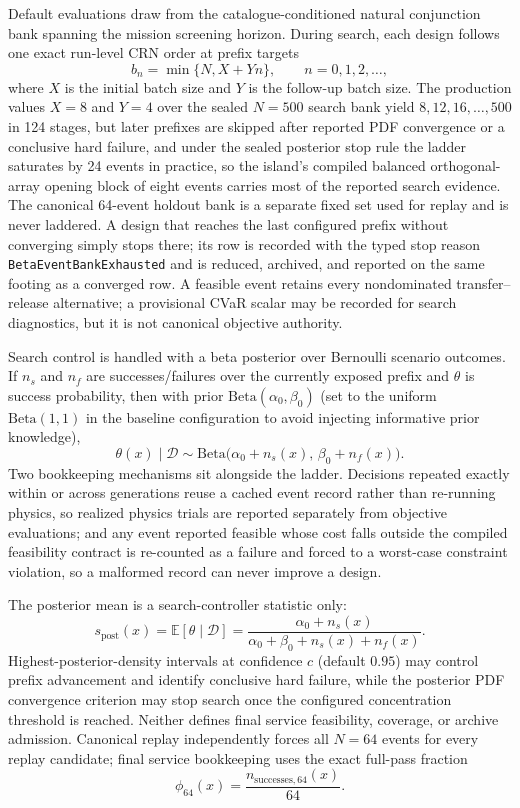     Default evaluations draw from the catalogue-conditioned natural conjunction bank spanning the mission screening horizon. During search, each design follows one exact run-level CRN order at prefix targets
    \[
        b_n=\min\{N,X+Yn\},\qquad n=0,1,2,\ldots,
    \]
    where \(X\) is the initial batch size and \(Y\) is the follow-up batch size. The production values \(X=8\) and \(Y=4\) over the sealed \(N=500\) search bank yield \(8,12,16,\ldots,500\) in 124 stages, but later prefixes are skipped after reported PDF convergence or a conclusive hard failure, and under the sealed posterior stop rule the ladder saturates by 24 events in practice, so the island's compiled balanced orthogonal-array opening block of eight events carries most of the reported search evidence. The canonical 64-event holdout bank is a separate fixed set used for replay and is never laddered. A design that reaches the last configured prefix without converging simply stops there; its row is recorded with the typed stop reason \verb|BetaEventBankExhausted| and is reduced, archived, and reported on the same footing as a converged row. A feasible event retains every nondominated transfer--release alternative; a provisional CVaR scalar may be recorded for search diagnostics, but it is not canonical objective authority.

    Search control is handled with a beta posterior over Bernoulli scenario outcomes. If \(n_s\) and \(n_f\) are successes/failures over the currently exposed prefix and \(\theta\) is success probability, then with prior \(\mathrm{Beta}(\alpha_0,\beta_0)\) (set to the uniform \(\mathrm{Beta}(1,1)\) in the baseline configuration to avoid injecting informative prior knowledge),
    \begin{equation}
        \theta(x)\mid\mathcal{D}\sim \mathrm{Beta}\!\bigl(\alpha_0+n_s(x),\,\beta_0+n_f(x)\bigr).
    \end{equation}
    Two bookkeeping mechanisms sit alongside the ladder. Decisions repeated exactly within or across generations reuse a cached event record rather than re-running physics, so realized physics trials are reported separately from objective evaluations; and any event reported feasible whose cost falls outside the compiled feasibility contract is re-counted as a failure and forced to a worst-case constraint violation, so a malformed record can never improve a design.

    The posterior mean is a search-controller statistic only:
    \begin{equation}
        s_{\mathrm{post}}(x)=\mathbb{E}[\theta\mid\mathcal{D}]
        =\frac{\alpha_0+n_s(x)}{\alpha_0+\beta_0+n_s(x)+n_f(x)}.
    \end{equation}
    Highest-posterior-density intervals at confidence \(c\) (default \(0.95\)) may control prefix advancement and identify conclusive hard failure, while the posterior PDF convergence criterion may stop search once the configured concentration threshold is reached. Neither defines final service feasibility, coverage, or archive admission. Canonical replay independently forces all \(N=64\) events for every replay candidate; final service bookkeeping uses the exact full-pass fraction
    \[
        \phi_{64}(x)=\frac{n_{\mathrm{successes},64}(x)}{64}.
    \]

